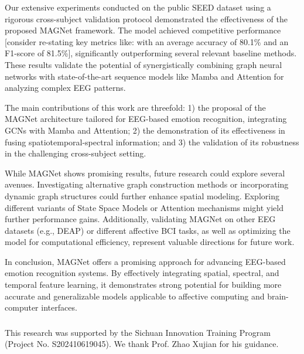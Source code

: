 \documentclass[runningheads]{llncs}
\begin{document}
Our extensive experiments conducted on the public SEED dataset using a rigorous cross-subject validation protocol demonstrated the effectiveness of the proposed MAGNet framework. The model achieved competitive performance [consider re-stating key metrics like: with an average accuracy of 80.1\% and an F1-score of 81.5\%], significantly outperforming several relevant baseline methods. These results validate the potential of synergistically combining graph neural networks with state-of-the-art sequence models like Mamba and Attention for analyzing complex EEG patterns.

The main contributions of this work are threefold: 1) the proposal of the MAGNet architecture tailored for EEG-based emotion recognition, integrating GCNs with Mamba and Attention; 2) the demonstration of its effectiveness in fusing spatiotemporal-spectral information; and 3) the validation of its robustness in the challenging cross-subject setting.

While MAGNet shows promising results, future research could explore several avenues. Investigating alternative graph construction methods or incorporating dynamic graph structures could further enhance spatial modeling. Exploring different variants of State Space Models or Attention mechanisms might yield further performance gains. Additionally, validating MAGNet on other EEG datasets (e.g., DEAP) or different affective BCI tasks, as well as optimizing the model for computational efficiency, represent valuable directions for future work.

In conclusion, MAGNet offers a promising approach for advancing EEG-based emotion recognition systems. By effectively integrating spatial, spectral, and temporal feature learning, it demonstrates strong potential for building more accurate and generalizable models applicable to affective computing and brain-computer interfaces.

\begin{credits}
\subsubsection{\ackname} 
This research was supported by the Sichuan Innovation Training Program (Project No.  S202410619045).  We thank Prof. Zhao Xujian for his guidance.

\end{credits}
\end{document}
